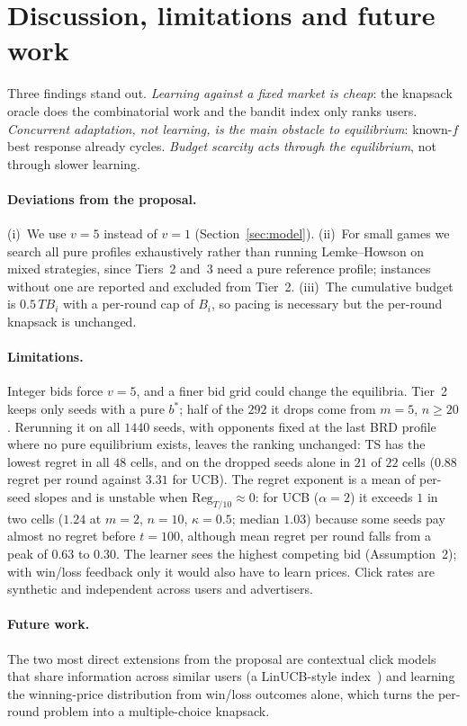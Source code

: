 \documentclass{article}
\theoremstyle{definition}
\newcommand{\Reg}{\mathrm{Reg}}
\begin{document}
\section{Discussion, limitations and future work}\label{sec:discussion}
Three findings stand out. \emph{Learning against a fixed market is cheap}: the knapsack oracle does the
combinatorial work and the bandit index only ranks users. \emph{Concurrent adaptation, not learning, is the main
obstacle to equilibrium}: known-$f$ best response already cycles. \emph{Budget scarcity acts through the
equilibrium}, not through slower learning.

\paragraph{Deviations from the proposal.} (i)~We use $v=5$ instead of $v=1$ (Section~\ref{sec:model}).
(ii)~For small games we search all pure profiles exhaustively rather than running Lemke--Howson on mixed
strategies, since Tiers~2 and~3 need a pure reference profile; instances without one are reported and
excluded from Tier~2. (iii)~The cumulative budget is $0.5\,TB_i$ with a per-round cap of $B_i$, so pacing is
necessary but the per-round knapsack is unchanged.

\paragraph{Limitations.} Integer bids force $v=5$, and a finer bid grid could change the equilibria. Tier~2
keeps only seeds with a pure $b^\ast$; half of the $292$ it drops come from $m=5$, $n\ge20$. Rerunning it on
all $1440$ seeds, with opponents fixed at the last BRD profile where no pure equilibrium exists, leaves the
ranking unchanged: TS has the lowest regret in all $48$ cells, and on the dropped seeds alone in $21$ of
$22$ cells ($0.88$ regret per round against $3.31$ for UCB). The regret exponent is a mean of
per-seed slopes and is unstable when $\Reg_{T/10}\approx0$: for UCB ($\alpha=2$) it exceeds $1$ in two cells
($1.24$ at $m=2$, $n=10$, $\kappa=0.5$; median $1.03$) because some seeds pay almost no regret before
$t=100$, although mean regret per round falls from a peak of $0.63$ to $0.30$. The learner sees the highest competing bid
(Assumption~2); with win/loss feedback only it would also have to learn prices. Click rates are synthetic and
independent across users and advertisers.

\paragraph{Future work.} The two most direct extensions from the proposal are contextual click models that
share information across similar users (a LinUCB-style index~\citep{li2010contextual}) and learning the
winning-price distribution from win/loss outcomes alone, which turns the per-round problem into a
multiple-choice knapsack.
\end{document}
